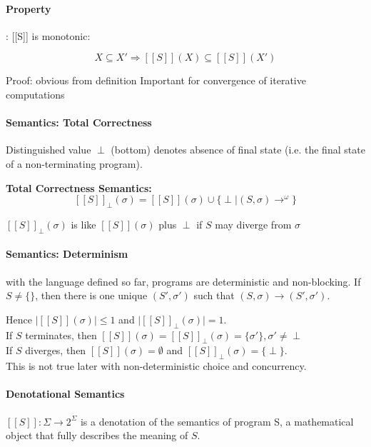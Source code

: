 \documentclass[12pt, a4paper]{book}
\begin{document}
\paragraph{Property}: [[S]] is monotonic:

$$
X \subseteq X' \Rightarrow [[S]](X) \subseteq [[S]](X')
$$

\noindent Proof: obvious from definition \newline
Important for convergence of iterative computations \newline

\paragraph{Semantics: Total Correctness}

Distinguished value $\perp$ (bottom) denotes absence of final state (i.e.
the final state of a non-terminating program).

\textbf{Total Correctness Semantics:}
$$
{[[S]]}_{\perp}(\sigma) = [[S]](\sigma) \cup \{\perp \mid (S,\sigma) \longrightarrow^{\omega}\}
$$

${[[S]]}_{\perp}(\sigma)$ is like $[[S]](\sigma)$ plus $\perp$ if $S$ may
diverge from $\sigma$

\paragraph{Semantics: Determinism}

with the language defined so far, programs are deterministic and non-blocking.
If $S \neq \{ \}$, then there is one unique $(S',\sigma')$ such that
$(S,\sigma) \longrightarrow (S', \sigma')$. \newline

Hence $\lvert [[S]](\sigma) \rvert \le 1$ and $\lvert {[[S]]}_{\perp}(\sigma) \rvert = 1$. \\
If $S$ terminates, then $[[S]](\sigma) = {[[S]]}_{\perp}(\sigma) = \{\sigma'\}, \sigma' \neq \perp$ \\
If $S$ diverges, then $[[S]](\sigma) = \emptyset$ and ${[[S]]}_{\perp}(\sigma) = \{\perp\}$. \\
This is not true later with non-deterministic choice and concurrency.

\paragraph{Denotational Semantics}

$[[S]] : \Sigma \rightarrow 2^{\Sigma}$ is a denotation of the semantics of
program S, a mathematical object that fully describes the meaning of $S$.
\end{document}
